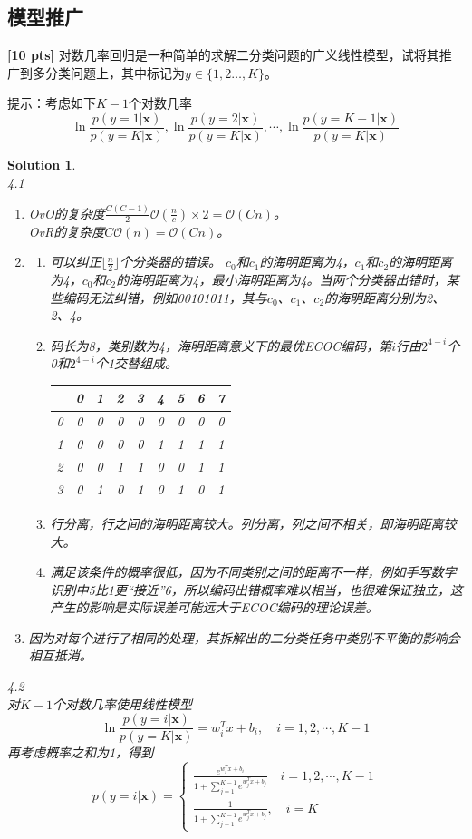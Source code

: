 \documentclass[a4paper,UTF8]{article}
\numberwithin{equation}{section}
\newtheorem*{solution}{Solution}
\begin{document}
\subsection{模型推广}
\textbf{[10 pts]} 对数几率回归是一种简单的求解二分类问题的广义线性模型，试将其推广到多分类问题上，其中标记为$y\in\{1,2\dots,K\}$。

提示：考虑如下$K-1$个对数几率
$$\ln\frac{p(y=1|\mathbf{x})}{p(y=K|\mathbf{x})},	\ln\frac{p(y=2|\mathbf{x})}{p(y=K|\mathbf{x})},\cdots,	\ln\frac{p(y=K-1|\mathbf{x})}{p(y=K|\mathbf{x})}$$

\begin{solution}
	~\\4.1
	\begin{enumerate}[(1)]
		\item 
		OvO的复杂度$\frac{C(C-1)}{2}\mathcal{O}(\frac nc)\times2=\mathcal{O}(Cn)$。\\
		OvR的复杂度$C\mathcal{O}(n)=\mathcal{O}(Cn)$。
		\item 
		\begin{enumerate}[1)]
			\item 
			可以纠正$\lfloor\frac{n}{2}\rfloor$个分类器的错误。
			$c_0$和$c_1$的海明距离为4，$c_1$和$c_2$的海明距离为4，$c_0$和$c_2$的海明距离为4，最小海明距离为4。当两个分类器出错时，某些编码无法纠错，例如00101011，其与$c_0$、$c_1$、$c_2$的海明距离分别为2、2、4。
			\item 
			码长为8，类别数为4，海明距离意义下的最优ECOC编码，第$i$行由$2^{4-i}$个0和$2^{4-i}$个1交替组成。
			\begin{center}
				\begin{tabular}[h]{|*{9}{c|}}
				\hline
				  & 0 & 1 & 2 & 3 & 4 & 5 & 6 & 7\\
				\hline
				0 & 0 & 0 & 0 & 0 & 0 & 0 & 0 & 0 \\
				1 & 0 & 0 & 0 & 0 & 1 & 1 & 1 & 1 \\
				2 & 0 & 0 & 1 & 1 & 0 & 0 & 1 & 1 \\
				3 & 0 & 1 & 0 & 1 & 0 & 1 & 0 & 1 \\
				\hline
				\end{tabular}
			\end{center}
			\item 
			行分离，行之间的海明距离较大。列分离，列之间不相关，即海明距离较大。
			\item 
			满足该条件的概率很低，因为不同类别之间的距离不一样，例如手写数字识别中5比1更“接近”6，所以编码出错概率难以相当，也很难保证独立，这产生的影响是实际误差可能远大于ECOC编码的理论误差。
		\end{enumerate}
	\item 
	因为对每个进行了相同的处理，其拆解出的二分类任务中类别不平衡的影响会相互抵消。
	\end{enumerate}
	4.2\\
	对$K-1$个对数几率使用线性模型
	\[\ln\frac{p(y=i|\mathbf{x})}{p(y=K|\mathbf{x})}=w_i^Tx+b_i,\quad i=1,2,\cdots,K-1\]
	再考虑概率之和为1，得到
	\[
	p(y=i|\mathbf{x})=
	\begin{cases}
	\frac{e^{w_i^Tx+b_i}}{1+\sum_{j=1}^{K-1} e^{w_j^Tx+b_j}}\quad i=1,2,\cdots,K-1\\
	\frac{1}{1+\sum_{j=1}^{K-1} e^{w_j^Tx+b_j}},\quad i=K
	\end{cases}
	\]
\end{solution}


\end{document}
